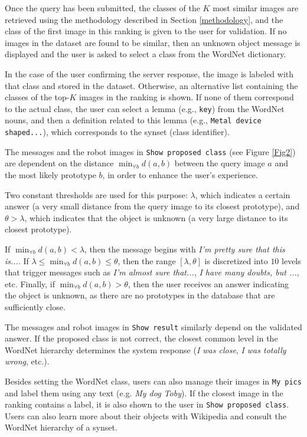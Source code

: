 \documentclass[final, twocolumn]{elsarticle}
\begin{document}
Once the query has been submitted, the classes of the $K$ most similar images are retrieved using the methodology described in Section \ref{methodology}, and the class of the first image in this ranking is given to the user for validation. If no images in the dataset are found to be similar, then an unknown object message is displayed and the user is asked to select a class from the WordNet dictionary.

In the case of the user confirming the server response, the image is labeled with that class and stored in the dataset. Otherwise, an alternative list containing the classes of the top-$K$ images in the ranking is shown. If none of them correspond to the actual class, the user can select a lemma (e.g., \texttt{key}) from the WordNet nouns, and then a definition related to this lemma (e.g.,  \texttt{Metal device shaped...}), which corresponds to the synset (class identifier).

The messages and the robot images in \texttt{Show proposed class} (see Figure \ref{Fig2}) are dependent on the distance $\min_{\forall{b}} {d(a,b)}$ between the query image $a$ and the most likely prototype $b$, in order to enhance the user’s experience.

Two constant thresholds are used for this purpose: $\lambda$, which indicates a certain answer (a very small distance from the query image to its closest prototype), and  $\theta>\lambda$, which indicates that the object is unknown (a very large distance to its closest prototype).

If $\min_{\forall{b}} {d(a,b)} < \lambda$, then the message begins with \textit{I'm pretty sure that this is...}. If $ \lambda \le \min_{\forall{b}}{d(a,b)} \le \theta$, then the range $[\lambda, \theta]$ is discretized into $10$ levels that trigger messages such as \textit{I'm almost sure that...}, \textit{I have many doubts, but ...}, etc. Finally, if $\min_{\forall{b}} {d(a,b)} > \theta$, then the user receives an answer indicating the object is unknown, as there are no prototypes in the database  that are sufficiently close.

The messages and robot images in \texttt{Show result} similarly depend on the validated answer. If the proposed class is not correct, the closest common level in the WordNet hierarchy determines the system response (\textit{I was close}, \textit{I was totally wrong}, etc.).

Besides setting the WordNet class, users can also manage their images in \texttt{My pics} and label them using any text (e.g. \textit{My dog Toby}).  If the closest image in the ranking contains a label, it is also shown to the user in \texttt{Show proposed class}. Users can also learn more about their objects with Wikipedia and consult the WordNet hierarchy of a synset.
\end{document}
